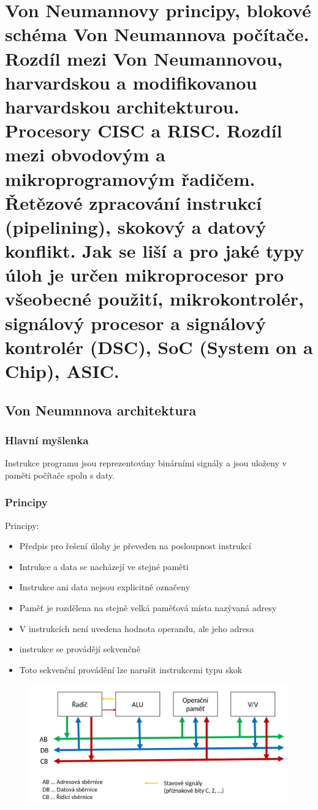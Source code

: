 \section{Von Neumannovy principy, blokové schéma Von Neumannova počítače. Rozdíl mezi Von Neumannovou, harvardskou a modifikovanou harvardskou architekturou. Procesory CISC a RISC. Rozdíl mezi obvodovým a mikroprogramovým řadičem. Řetězové zpracování instrukcí (pipelining), skokový a datový konflikt. Jak se liší a pro jaké typy úloh je určen mikroprocesor pro všeobecné použití, mikrokontrolér, signálový procesor a signálový kontrolér (DSC), SoC (System on a Chip), ASIC.}
\subsection{Von Neumnnova architektura}
\subsubsection*{Hlavní myšlenka}
Instrukce programu jsou reprezentovány binárními signály a jsou uloženy v paměti počítače spolu s daty. \\
\subsubsection*{Principy}
Principy:
\begin{itemize}
    \item Předpis pro řešení úlohy je převeden na posloupnost instrukcí
    \item Intrukce a data se nacházejí ve stejné paměti
    \item Instrukce ani data nejsou explicitně označeny
    \item Paměť je rozdělena na stejně velká paměťová místa nazývaná adresy
    \item V instrukcích není uvedena hodnota operandu, ale jeho adresa
    \item instrukce se provádějí sekvenčně
    \item Toto sekvenční provádění lze narušit instrukcemi typu skok
\end{itemize}

\begin{figure}[h!]
    \centering
    \includegraphics[width = \textwidth]{img/VonNeumann.png}
\end{figure}

